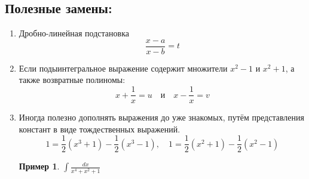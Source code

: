 \documentclass[a4paper,12pt]{article}
\newtheorem{lemma}{Пример}
\begin{document}
	\subsection{Полезные замены:}
	\begin{enumerate}
		\item
		Дробно-линейная подстановка
		\[
		\frac{x-a}{x-b}=t
		\]
		\item
		Если подыинтегральное выражение содержит множители $x^{2}-1$ и $x^{2}+1$, а также возвратные полиномы:
		\[
		x+\frac{1}{x}=u \quad \text{и} \quad x-\frac{1}{x}=v
		\]
		
		\item
		Иногда полезно дополнять выражения до уже знакомых, путём представления констант в виде тождественных выражений.
		$$1=\frac{1}{2}\left(x^{3}+1\right)-\frac{1}{2}\left(x^{3}-1\right), \quad 1=\frac{1}{2}\left(x^{2}+1\right)-\frac{1}{2}\left(x^{2}-1\right)$$
		\begin{lemma}
			$\int \frac{d x}{x^{4}+x^{2}+1}$
		\end{lemma}	
		
	\end{enumerate}
\end{document}
